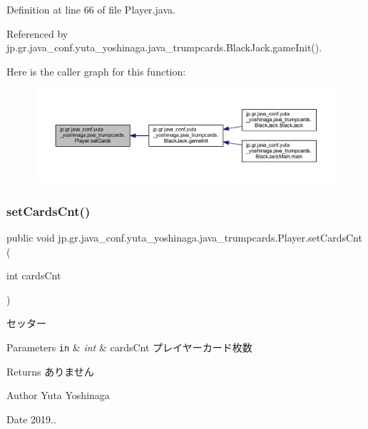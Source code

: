 Definition at line 66 of file Player.\+java.



Referenced by jp.\+gr.\+java\+\_\+conf.\+yuta\+\_\+yoshinaga.\+java\+\_\+trumpcards.\+Black\+Jack.\+game\+Init().

Here is the caller graph for this function\+:
\nopagebreak
\begin{figure}[H]
\begin{center}
\leavevmode
\includegraphics[width=350pt]{classjp_1_1gr_1_1java__conf_1_1yuta__yoshinaga_1_1java__trumpcards_1_1_player_af3a6a421101b6e8ba60e9578a1b9ec74_icgraph}
\end{center}
\end{figure}
\mbox{\label{classjp_1_1gr_1_1java__conf_1_1yuta__yoshinaga_1_1java__trumpcards_1_1_player_a658b393d95e9658b88c8aedcb44a5728}} 
\subsubsection{\texorpdfstring{set\+Cards\+Cnt()}{setCardsCnt()}}
{\footnotesize\ttfamily public void jp.\+gr.\+java\+\_\+conf.\+yuta\+\_\+yoshinaga.\+java\+\_\+trumpcards.\+Player.\+set\+Cards\+Cnt (\begin{DoxyParamCaption}\item[{int}]{cards\+Cnt }\end{DoxyParamCaption})}



セッター 


\begin{DoxyParams}[1]{Parameters}
\mbox{\tt in}  & {\em int} & cards\+Cnt プレイヤーカード枚数 \\
\hline
\end{DoxyParams}
\begin{DoxyReturn}{Returns}
ありません 
\end{DoxyReturn}
\begin{DoxyAuthor}{Author}
Yuta Yoshinaga 
\end{DoxyAuthor}
\begin{DoxyDate}{Date}
2019.. 
\end{DoxyDate}


